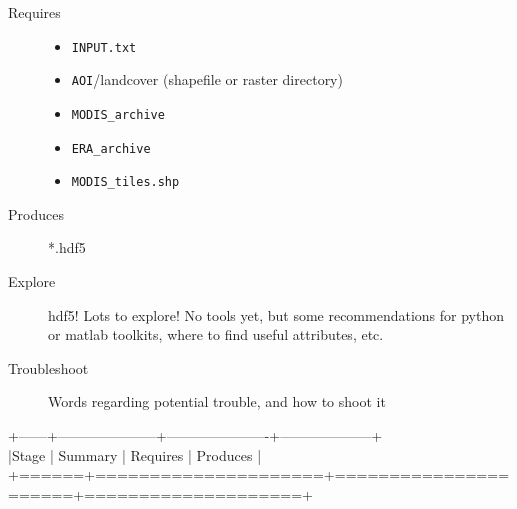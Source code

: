 \documentclass[twoside,a4paper]{refart}
\begin{document}
  \begin{description}
    \item [Requires]
      \begin{itemize}
        \item
          \texttt{INPUT.txt}
        \item
          \texttt{AOI}/landcover (shapefile or raster directory)
        \item
          \texttt{MODIS\_archive}
        \item
          \texttt{ERA\_archive}
        \item
          \texttt{MODIS\_tiles.shp}
\\
      \end{itemize}
  
  
    \item [Produces]
      *.hdf5
      

    \item [Explore]
      hdf5!  Lots to explore!  No tools yet, but some recommendations for python or matlab toolkits, where to find useful attributes, etc.

    \item [Troubleshoot]
      Words regarding potential trouble, and how to shoot it
  \end{description}
\newpage
 +------+---------------------+----------------------+--------------------+\\
    |Stage | Summary             | Requires             | Produces           |\\
    +======+=====================+======================+====================+\\
\end{document}
